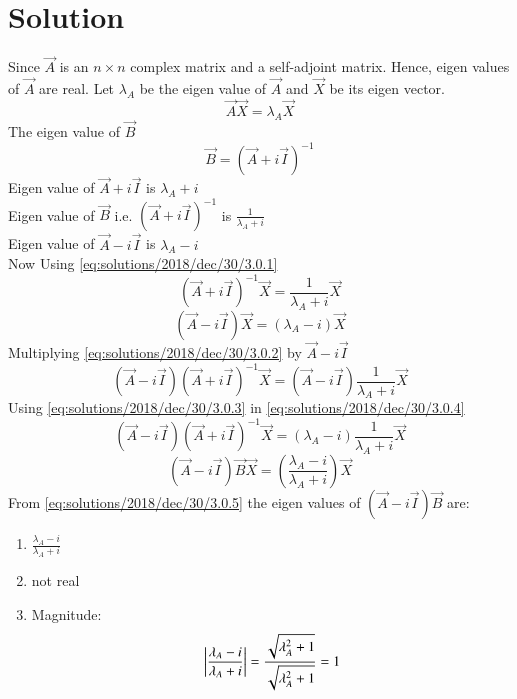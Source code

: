 \section{Solution}
Since $\vec{A}$ is an $n \times n$ complex matrix and a self-adjoint matrix. Hence, eigen values of $\vec{A}$ are real.
Let $\lambda_A$ be the eigen value of $\vec{A}$ and $\vec{X}$ be its eigen vector.
\begin{equation}\label{eq:solutions/2018/dec/30/3.0.1}
\vec{A}\vec{X} = \lambda_A \vec{X} 
\end{equation}
The eigen value of $\vec{B}$
\begin{equation*}
\vec{B} = (\vec{A}+i\vec{I})^{-1}
\end{equation*}
 Eigen value of $\vec{A}+i\vec{I}$ is $\lambda_A+i$\\
 Eigen value of $\vec{B}$ i.e. $(\vec{A}+i\vec{I})^{-1}$ is $\frac{1}{\lambda_A+i}$\\
 Eigen value of $\vec{A}-i\vec{I}$ is $\lambda_A-i$\\
 Now Using \eqref{eq:solutions/2018/dec/30/3.0.1}
 \begin{equation}\label{eq:solutions/2018/dec/30/3.0.2}
 (\vec{A}+i\vec{I})^{-1} \vec{X} = \frac{1}{\lambda_A+i} \vec{X}
 \end{equation}
 \begin{equation}\label{eq:solutions/2018/dec/30/3.0.3}
 (\vec{A}-i\vec{I}) \vec{X} = (\lambda_A-i) \vec{X}
 \end{equation}
 Multiplying \eqref{eq:solutions/2018/dec/30/3.0.2} by $\vec{A}-i\vec{I}$
 \begin{equation}\label{eq:solutions/2018/dec/30/3.0.4}
 (\vec{A}-i\vec{I})(\vec{A}+i\vec{I})^{-1} \vec{X} = (\vec{A}-i\vec{I})  \frac{1}{\lambda_A+i} \vec{X}
 \end{equation}
 Using \eqref{eq:solutions/2018/dec/30/3.0.3} in \eqref{eq:solutions/2018/dec/30/3.0.4}
 \begin{equation*}
 (\vec{A}-i\vec{I})(\vec{A}+i\vec{I})^{-1} \vec{X} = (\lambda_A-i) \frac{1}{\lambda_A+i} \vec{X}
 \end{equation*}
 \begin{equation} \label{eq:solutions/2018/dec/30/3.0.5}
 (\vec{A}-i\vec{I})\vec{B} \vec{X} = \left(\frac{\lambda_A-i}{\lambda_A+i}\right) \vec{X}
 \end{equation}
 From \eqref{eq:solutions/2018/dec/30/3.0.5} the eigen values of $(\vec{A}-i\vec{I})\vec{B}$ are:
 \begin{enumerate}
 \item $\frac{\lambda_A-i}{\lambda_A+i}$
 \item not real 
 \item Magnitude:
 \begin{equation}
 \left| \frac{\lambda_A-i}{\lambda_A+i} \right| = \frac{\sqrt{\lambda_A^2+1}}{\sqrt{\lambda_A^2+1}}\\ = 1
 \end{equation}
 \end{enumerate}
